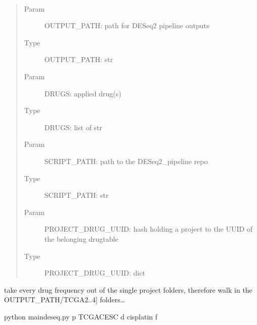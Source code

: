 \documentclass[letterpaper,10pt,english]{sphinxmanual}
\begin{document}

\begin{fulllineitems}
\label{\detokenize{index:walk_all_drug_frequency.drug_frequency_all_single_projects}}~\begin{quote}\begin{description}
\item[{Param}] \leavevmode
\sphinxAtStartPar
OUTPUT\_PATH: path for DESeq2 pipeline outputs

\item[{Type}] \leavevmode
\sphinxAtStartPar
OUTPUT\_PATH: str

\item[{Param}] \leavevmode
\sphinxAtStartPar
DRUGS: applied drug(s)

\item[{Type}] \leavevmode
\sphinxAtStartPar
DRUGS: list of str

\item[{Param}] \leavevmode
\sphinxAtStartPar
SCRIPT\_PATH: path to the DESeq2\_pipeline repo

\item[{Type}] \leavevmode
\sphinxAtStartPar
SCRIPT\_PATH: str

\item[{Param}] \leavevmode
\sphinxAtStartPar
PROJECT\_DRUG\_UUID: hash holding a project to the UUID of the    belonging drugtable

\item[{Type}] \leavevmode
\sphinxAtStartPar
PROJECT\_DRUG\_UUID: dict

\end{description}\end{quote}

\sphinxAtStartPar
take every drug frequency out of the single project folders, therefore walk
in the OUTPUT\_PATH/TCGA\sphinxhyphen{}{[}2..4{]} folders…

\begin{sphinxVerbatim}[commandchars=\\\{\}]
\PYGZdl{} python main\PYGZus{}deseq.py \PYGZhy{}p TCGA\PYGZhy{}CESC \PYGZhy{}d cisplatin \PYGZhy{}f 
\end{sphinxVerbatim}

\end{fulllineitems}
\end{document}
